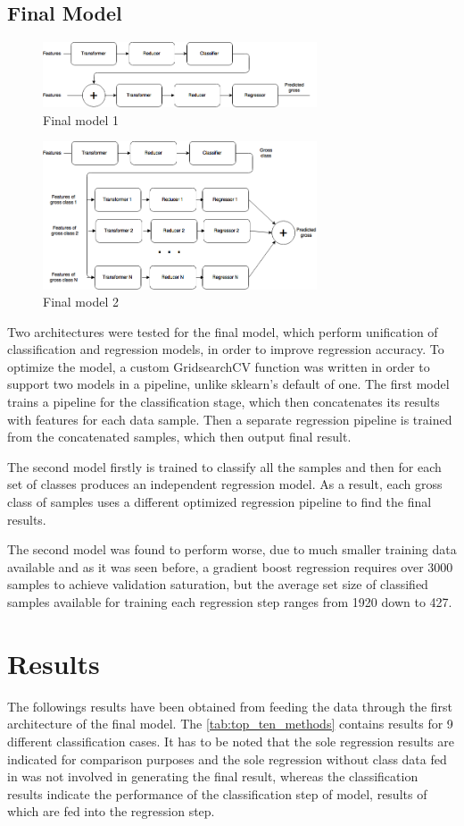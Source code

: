 \subsection{Final Model}
\begin{figure}[h]
\centering
\includegraphics[width=3.2in]{figures/finalmodel1}
\caption{Final model 1}
\label{fig:model1}
\end{figure}
\begin{figure}[h]
\centering
\includegraphics[width=3.2in]{figures/finalmodel2}
\caption{Final model 2}
\label{fig:model2}
\end{figure}
Two architectures were tested for the final model, which perform unification of classification and regression models, in order to improve regression accuracy. To optimize the model, a custom GridsearchCV function was written in order to support two models in a pipeline, unlike sklearn’s default of one. The first model trains a pipeline for the classification stage, which then concatenates its results with features for each data sample. Then a separate regression pipeline is trained from the concatenated samples, which then output final result.

The second model firstly is trained to classify all the samples and then for each set of classes produces an independent regression model. As a result, each gross class of samples uses a different optimized regression pipeline to find the final results.

The second model was found to perform worse, due to much smaller training data available and as it was seen before, a gradient boost regression requires over 3000 samples to achieve validation saturation, but the average set size of classified samples available for training each regression step  ranges from 1920 down to 427.

\section{Results}
The followings results have been obtained from feeding the data through the first architecture of the final model. The \tablename{} \ref{tab:top_ten_methods} contains results for 9 different classification cases. It has to be noted that the sole regression results are indicated for comparison purposes and the sole regression without class data fed in was not involved in generating the final result, whereas the classification results indicate the performance of the classification step of model, results of which are fed into the regression step.

